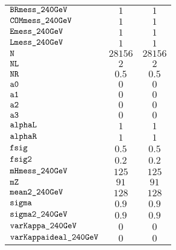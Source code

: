 \begin{tabular}{lcc}
$\verb+BRmess_240GeV+ $ & $  1$ & $ 1$\\
$\verb+COMmess_240GeV+ $ & $  1$ & $ 1$\\
$\verb+Emess_240GeV+ $ & $  1$ & $ 1$\\
$\verb+Lmess_240GeV+ $ & $  1$ & $ 1$\\
$\verb+N+ $ & $  28156$ & $ 28156$\\
$\verb+NL+ $ & $  2$ & $ 2$\\
$\verb+NR+ $ & $  0.5$ & $ 0.5$\\
$\verb+a0+ $ & $  0$ & $ 0$\\
$\verb+a1+ $ & $  0$ & $ 0$\\
$\verb+a2+ $ & $  0$ & $ 0$\\
$\verb+a3+ $ & $  0$ & $ 0$\\
$\verb+alphaL+ $ & $  1$ & $ 1$\\
$\verb+alphaR+ $ & $  1$ & $ 1$\\
$\verb+fsig+ $ & $  0.5$ & $ 0.5$\\
$\verb+fsig2+ $ & $  0.2$ & $ 0.2$\\
$\verb+mHmess_240GeV+ $ & $  125$ & $ 125$\\
$\verb+mZ+ $ & $  91$ & $ 91$\\
$\verb+mean2_240GeV+ $ & $  128$ & $ 128$\\
$\verb+sigma+ $ & $  0.9$ & $ 0.9$\\
$\verb+sigma2_240GeV+ $ & $  0.9$ & $ 0.9$\\
$\verb+varKappa_240GeV+ $ & $  0$ & $ 0$\\
$\verb+varKappaideal_240GeV+ $ & $  0$ & $ 0$\\
\end{tabular}
